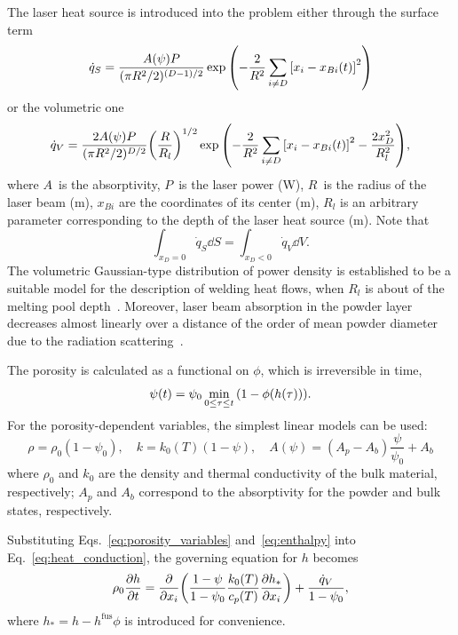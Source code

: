 \documentclass{article}
\newcommand{\fusion}[1]{{#1}^\mathrm{fus}}
\begin{document}
The laser heat source is introduced into the problem either through the surface term
\begin{equation}\label{eq:laser_surface}
    \dot{q}_S = \frac{A(\psi)P}{(\pi R^2/2)^{(D-1)/2}}\exp\qty( -\frac2{R^2}\sum_{i\neq D}\qty[x_i-x_{Bi}(t)]^2 )
\end{equation}
or the volumetric one
\begin{equation}\label{eq:laser_volumetric}
    \dot{q}_V = \frac{2A(\psi)P}{(\pi R^2/2)^{D/2}}\qty(\frac{R}{R_l})^{1/2}
    \exp\qty( -\frac2{R^2}\sum_{i\neq D}\qty[x_i-x_{Bi}(t)]^2 - \frac{2x_D^2}{R_l^2} ),
\end{equation}
where \(A\)~is the absorptivity, \(P\)~is the laser power (\si{W}), \(R\)~is the radius of the laser beam (\si{m}),
\(x_{Bi}\) are the coordinates of its center (\si{m}),
\(R_l\) is an arbitrary parameter corresponding to the depth of the laser heat source (\si{m}).
Note that
\[ \int_{x_D=0} \dot{q}_S \dd{S} = \int_{x_D<0} \dot{q}_V \dd{V}. \]
The volumetric Gaussian-type distribution of power density is established to be a suitable model
for the description of welding heat flows, when \(R_l\) is about of the melting pool depth~\cite{Goldak1984}.
Moreover, laser beam absorption in the powder layer decreases almost linearly
over a distance of the order of mean powder diameter due to the radiation scattering~\cite{Gusarov2009}.

The porosity is calculated as a functional on \(\phi\), which is irreversible in time,
\begin{equation}\label{eq:porosity}
    \psi(t) = \psi_0\min_{0\leq\tau\leq t}\qty( 1-\phi(h(\tau)) ).
\end{equation}
For the porosity-dependent variables, the simplest linear models can be used:
\begin{equation}\label{eq:porosity_variables}
    \rho = \rho_0(1-\psi_0), \quad k = k_0(T)(1-\psi), \quad A(\psi) = (A_p - A_b)\frac{\psi}{\psi_0} + A_b
\end{equation}
where \(\rho_0\) and \(k_0\) are the density and thermal conductivity of the bulk material, respectively;
\(A_p\) and \(A_b\) correspond to the absorptivity for the powder and bulk states, respectively.

Substituting Eqs.~\eqref{eq:porosity_variables} and~\eqref{eq:enthalpy} into Eq.~\eqref{eq:heat_conduction},
the governing equation for \(h\) becomes
\begin{equation}\label{eq:heat_conduction_star}
    \rho_0\pdv{h}{t} = \pdv{x_i}\qty( \frac{1-\psi}{1-\psi_0} \frac{k_0(T)}{c_p(T)}\pdv{h_*}{x_i} ) + \frac{\dot{q}_V}{1-\psi_0},
\end{equation}
where \(h_* = h - \fusion{h}\phi\) is introduced for convenience.
\end{document}
